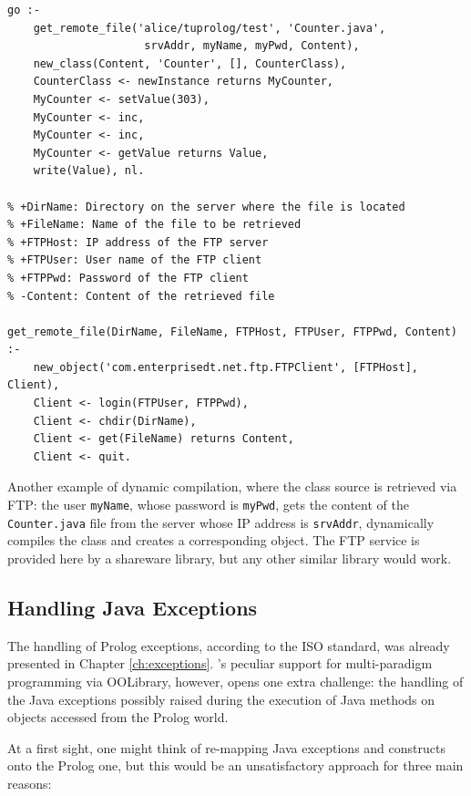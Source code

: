 \begin{table}
{\small
\begin{verbatim}
go :-
    get_remote_file('alice/tuprolog/test', 'Counter.java',
                     srvAddr, myName, myPwd, Content),
    new_class(Content, 'Counter', [], CounterClass),
    CounterClass <- newInstance returns MyCounter,
    MyCounter <- setValue(303),
    MyCounter <- inc,
    MyCounter <- inc,
    MyCounter <- getValue returns Value,
    write(Value), nl.

% +DirName: Directory on the server where the file is located
% +FileName: Name of the file to be retrieved
% +FTPHost: IP address of the FTP server
% +FTPUser: User name of the FTP client
% +FTPPwd: Password of the FTP client
% -Content: Content of the retrieved file

get_remote_file(DirName, FileName, FTPHost, FTPUser, FTPPwd, Content) :-
    new_object('com.enterprisedt.net.ftp.FTPClient', [FTPHost], Client),
    Client <- login(FTPUser, FTPPwd),
    Client <- chdir(DirName),
    Client <- get(FileName) returns Content,
    Client <- quit.
\end{verbatim}
}
\caption{Another example of dynamic compilation, where the class source is retrieved via FTP: the user \texttt{myName}, whose password is \texttt{myPwd}, gets the content of the \texttt{Counter.java} file from the server whose IP address is \texttt{srvAddr}, dynamically compiles the class and creates a corresponding object. The FTP service is provided here by a shareware library, but any other similar library would work.}
\label{tab:dynamic-compilation-via-FTP}
\end{table}

\subsection{Handling Java Exceptions}
\label{ssec:java-exceptions-in-tuprolog}

The handling of Prolog exceptions, according to the ISO standard, was already presented in Chapter \ref{ch:exceptions}.
%
\tuprolog{}'s peculiar support for multi-paradigm programming via OOLibrary, however, opens one extra challenge: the handling of the Java exceptions possibly raised during the execution of Java methods on objects accessed from the Prolog world.

At a first sight, one might think of re-mapping Java exceptions and constructs onto the Prolog one, but this would be an unsatisfactory approach for three main reasons:


